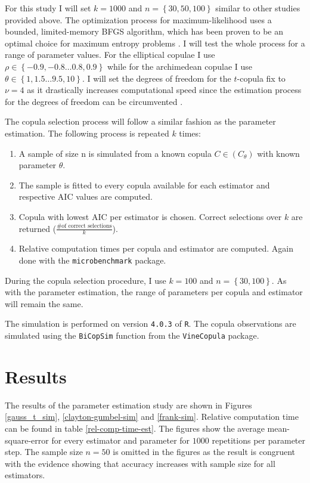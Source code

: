 For this study I will set $k = 1000$ and $ n = \left\lbrace 30,50,100 \right\rbrace $ similar to other studies provided above. The optimization process for maximum-likelihood uses a bounded, limited-memory BFGS algorithm, which has been proven to be an optimal choice for maximum entropy problems \citep{malouf2002comparison}. I will test the whole process for a range of parameter values. For the elliptical copulae I use $\rho \in \left\lbrace -0.9,-0.8 \dots 0.8,0.9 \right\rbrace $ while for the archimedean copulae I use $\theta \in \left\lbrace 1,1.5 \dots 9.5,10 \right\rbrace $. I will set the degrees of freedom for the $t$-copula fix to $\nu = 4$ as it drastically increases computational speed since the estimation process for the degrees of freedom can be circumvented \citep{lucas2014conditional}. 

The copula selection process will follow a similar fashion as the parameter estimation. The following process is repeated $k$ times:

\begin{enumerate}
	\itemsep0em
	\item A sample of size n is simulated from a known copula $C \in (C_\theta)$ with known parameter $\theta$.
	\item The sample is fitted to every copula available for each estimator and respective AIC values are computed.
	\item Copula with lowest AIC per estimator is chosen. Correct selections over $k$ are returned ($\frac{\# \text{of correct selections}}{k}$).
	\item Relative computation times per copula and estimator are computed. Again done with the \verb*|microbenchmark| package.
\end{enumerate}

During the copula selection procedure, I use $k = 100$ and  $ n = \left\lbrace 30,100 \right\rbrace $. As with the parameter estimation, the range of parameters per copula and estimator will remain the same.

The simulation is performed on version \verb*|4.0.3| of \verb*|R|. The copula observations are simulated using the \verb*|BiCopSim| function from the \verb*|VineCopula| package.

\section{Results}

The results of the parameter estimation study are shown in Figures \ref{gauss_t_sim}, \ref{clayton-gumbel-sim} and \ref{frank-sim}. Relative computation time can be found in table \ref{rel-comp-time-est}. The figures show the average mean-square-error for every estimator and parameter for $1000$ repetitions per parameter step. The sample size $n = 50$ is omitted in the figures as the result is congruent with the evidence showing that accuracy increases with sample size for all estimators.

